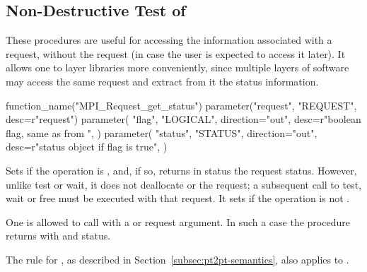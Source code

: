 \subsection{Non-Destructive Test of \texorpdfstring{}{status}}
\label{subsec:pt2pt-teststatus}

These procedures are useful for accessing the information associated with a
request, without  the request (in case the user is expected to access
it later).  It allows one to layer libraries more conveniently,
since multiple layers of software may access the same  request and
extract from it the status information.

\begin{mpi-binding}
    function_name("MPI_Request_get_status")
    parameter("request", "REQUEST", desc=r"request")
    parameter(
        "flag",
        "LOGICAL",
        direction="out",
        desc=r"boolean flag, same as from ",
    )
    parameter(
        "status",
        "STATUS",
        direction="out",
        desc=r"status object if flag is true",
    )
\end{mpi-binding}

Sets  if the operation is , and, if so, returns in
status the request status.  However, unlike test or wait, it does not
deallocate or  the request; a subsequent call to test, wait or free
must be executed with that request.  It sets  if the
operation is not .

One is allowed to call  with a  or 
request argument. In such a case the procedure returns with  and  status.

The 
rule for , as described in Section~\ref{subsec:pt2pt-semantics}, also applies to .

